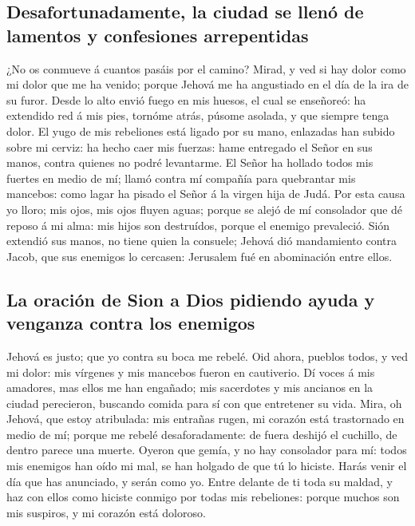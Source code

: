 \hypertarget{desafortunadamente-la-ciudad-se-llenuxf3-de-lamentos-y-confesiones-arrepentidas}{%
\subsection{Desafortunadamente, la ciudad se llenó de lamentos y
confesiones
arrepentidas}\label{desafortunadamente-la-ciudad-se-llenuxf3-de-lamentos-y-confesiones-arrepentidas}}

 ¿No os conmueve á cuantos pasáis por el camino? Mirad, y
ved si hay dolor como mi dolor que me ha venido; porque Jehová me ha
angustiado en el día de la ira de su furor.  Desde lo
alto envió fuego en mis huesos, el cual se enseñoreó: ha extendido red á
mis pies, tornóme atrás, púsome asolada, y que siempre tenga dolor.
 El yugo de mis rebeliones está ligado por su mano,
enlazadas han subido sobre mi cerviz: ha hecho caer mis fuerzas: hame
entregado el Señor en sus manos, contra quienes no podré levantarme.
 El Señor ha hollado todos mis fuertes en medio de mí;
llamó contra mí compañía para quebrantar mis mancebos: como lagar ha
pisado el Señor á la virgen hija de Judá.  Por esta causa
yo lloro; mis ojos, mis ojos fluyen aguas; porque se alejó de mí
consolador que dé reposo á mi alma: mis hijos son destruídos, porque el
enemigo prevaleció.  Sión extendió sus manos, no tiene
quien la consuele; Jehová dió mandamiento contra Jacob, que sus enemigos
lo cercasen: Jerusalem fué en abominación entre ellos.

\hypertarget{la-oraciuxf3n-de-sion-a-dios-pidiendo-ayuda-y-venganza-contra-los-enemigos}{%
\subsection{La oración de Sion a Dios pidiendo ayuda y venganza contra
los
enemigos}\label{la-oraciuxf3n-de-sion-a-dios-pidiendo-ayuda-y-venganza-contra-los-enemigos}}

 Jehová es justo; que yo contra su boca me rebelé. Oid
ahora, pueblos todos, y ved mi dolor: mis vírgenes y mis mancebos fueron
en cautiverio.  Dí voces á mis amadores, mas ellos me han
engañado; mis sacerdotes y mis ancianos en la ciudad perecieron,
buscando comida para sí con que entretener su vida. 
Mira, oh Jehová, que estoy atribulada: mis entrañas rugen, mi corazón
está trastornado en medio de mí; porque me rebelé desaforadamente: de
fuera deshijó el cuchillo, de dentro parece una muerte. 
Oyeron que gemía, y no hay consolador para mí: todos mis enemigos han
oído mi mal, se han holgado de que tú lo hiciste. Harás venir el día que
has anunciado, y serán como yo.  Entre delante de ti toda
su maldad, y haz con ellos como hiciste conmigo por todas mis
rebeliones: porque muchos son mis suspiros, y mi corazón está doloroso.

